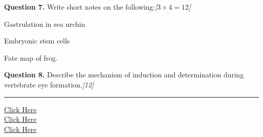 \documentclass[11pt,a4paper]{article}
\newcommand{\pts}[1]{\hfill   \textit{[#1]}}
\begin{document}
\medskip


\noindent   \textbf{Question 7.} Write short notes on the following:\pts{$3  \times 4 = 12$}

\begin{parts}
  \item Gastrulation in sea urchin
  \item Embryonic stem cells
  \item Fate map of frog.
\end{parts}

\medskip


\noindent   \textbf{Question 8.} Describe the mechanism of induction and determination during vertebrate eye formation.\pts{12}

\vfill
\rule{\linewidth}{0.4pt}

\begin{center}\small
\href{https://bhu-exam.vercel.app/}{Click Here}\\[4pt]\href{https://me-aryan.vercel.app/}{Click Here}\\[4pt]\href{https://quashan-me.vercel.app/}{Click Here}
\end{center}
\end{document}
